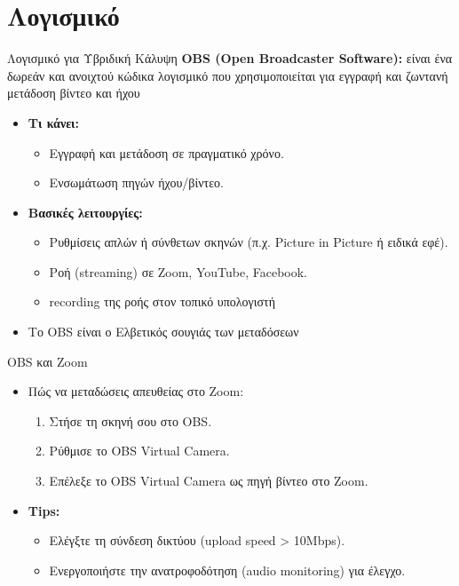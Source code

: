 \documentclass[aspectratio=169]{beamer}
\begin{document}
\section{Λογισμικό}
\begin{frame}{Λογισμικό για Υβριδική Κάλυψη}
  \textbf{OBS (Open Broadcaster Software):}
  είναι ένα δωρεάν και ανοιχτού κώδικα λογισμικό που χρησιμοποιείται για
  εγγραφή και ζωντανή μετάδοση βίντεο και ήχου
  \begin{itemize}
  \item \textbf{Τι κάνει:}
    \begin{itemize}
    \item Εγγραφή και μετάδοση σε πραγματικό χρόνο.
    \item Ενσωμάτωση πηγών ήχου/βίντεο.
    \end{itemize}
  \item \textbf{Βασικές λειτουργίες:}
    \begin{itemize}
    \item Ρυθμίσεις απλών ή σύνθετων σκηνών (π.χ. Picture in Picture ή ειδικά εφέ).
    \item Ροή (streaming) σε Zoom, YouTube, Facebook.
    \item recording της ροής στον τοπικό υπολογιστή
    \end{itemize}
  \item Το OBS είναι ο Ελβετικός σουγιάς των μεταδόσεων
  \end{itemize}
\end{frame}

\begin{frame}{OBS και Zoom}
  \begin{itemize}
  \item Πώς να μεταδώσεις απευθείας στο Zoom:
    \begin{enumerate}
    \item Στήσε τη σκηνή σου στο OBS.
    \item Ρύθμισε το OBS Virtual Camera.
    \item Επέλεξε το OBS Virtual Camera ως πηγή βίντεο στο Zoom.
    \end{enumerate}
  \item \textbf{Tips:}
    \begin{itemize}
    \item Ελέγξτε τη σύνδεση δικτύου (upload speed > 10Mbps).
    \item Ενεργοποιήστε την ανατροφοδότηση (audio monitoring) για έλεγχο.
    \end{itemize}
  \end{itemize}
\end{frame}
\end{document}
